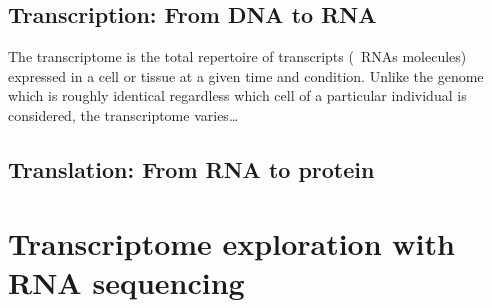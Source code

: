 \subsection{Transcription: From \gls{DNA} to \gls{RNA}}
\begin{comment}
Transcriptome is the complete population of \gls{RNA} in a cell or a group of
cells. There are many kinds of them:
\begin{itemize}
    \item \gls{ncRNA}
    \item \gls{tRNA}
    \item \gls{miRNA}
    \item \gls{snRNA}
    \item \gls{scaRNA}
    \item \gls{snoRNA}
    \item \gls{scRNA}
\end{itemize}
\end{comment}

The transcriptome is the total repertoire of transcripts (\ie\ \glspl{RNA}
molecules) expressed in a cell or tissue at a given time and condition. Unlike
the genome which is roughly identical regardless which cell of a particular
individual is considered, the transcriptome varies\ldots

\subsection{Translation: From \gls{RNA} to protein}


\section{Transcriptome exploration with RNA sequencing}


\begin{comment}
Biological research uses mainly two approaches to
study the cell life intricacy and its underlying mechanisms.\\
The oldest approach is descriptive:


Small bits: corrections for Rnaseq are already part of the analysis and
requires often as much flair than skills.
Contrarily to \Dnaseq\ where corrections can be applied \TK{add reference} and
then the analysis be done, in Rnaseq each analysis requires a set of conform
quantification and normalisation methods.
While, there are quite established protocols for differential expression analysis,
there are presently many other downstream analyses that are cumbersome
and/or not settled yet. This is the case for this study.
\end{comment}

